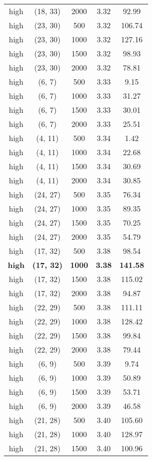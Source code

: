 \begin{tabular}{c c c c c}
high & (18, 33) &  2000 & 3.32 & 92.99 \\
high & (23, 30) &  500 & 3.32 & 106.74 \\
high & (23, 30) &  1000 & 3.32 & 127.16 \\
high & (23, 30) &  1500 & 3.32 & 98.93 \\
high & (23, 30) &  2000 & 3.32 & 78.81 \\
high & (6, 7) &  500 & 3.33 & 9.15 \\
high & (6, 7) &  1000 & 3.33 & 31.27 \\
high & (6, 7) &  1500 & 3.33 & 30.01 \\
high & (6, 7) &  2000 & 3.33 & 25.51 \\
high & (4, 11) &  500 & 3.34 & 1.42 \\
high & (4, 11) &  1000 & 3.34 & 22.68 \\
high & (4, 11) &  1500 & 3.34 & 30.69 \\
high & (4, 11) &  2000 & 3.34 & 30.85 \\
high & (24, 27) &  500 & 3.35 & 76.34 \\
high & (24, 27) &  1000 & 3.35 & 89.35 \\
high & (24, 27) &  1500 & 3.35 & 70.25 \\
high & (24, 27) &  2000 & 3.35 & 54.79 \\
high & (17, 32) &  500 & 3.38 & 98.54 \\
\textbf{high} & \textbf{(17, 32)} & \textbf{ 1000} & \textbf{3.38} & \textbf{141.58} \\
high & (17, 32) &  1500 & 3.38 & 115.02 \\
high & (17, 32) &  2000 & 3.38 & 94.87 \\
high & (22, 29) &  500 & 3.38 & 111.11 \\
high & (22, 29) &  1000 & 3.38 & 128.42 \\
high & (22, 29) &  1500 & 3.38 & 99.84 \\
high & (22, 29) &  2000 & 3.38 & 79.44 \\
high & (6, 9) &  500 & 3.39 & 9.74 \\
high & (6, 9) &  1000 & 3.39 & 50.89 \\
high & (6, 9) &  1500 & 3.39 & 53.71 \\
high & (6, 9) &  2000 & 3.39 & 46.58 \\
high & (21, 28) &  500 & 3.40 & 105.60 \\
high & (21, 28) &  1000 & 3.40 & 128.97 \\
high & (21, 28) &  1500 & 3.40 & 100.96 \\

\end{tabular}
